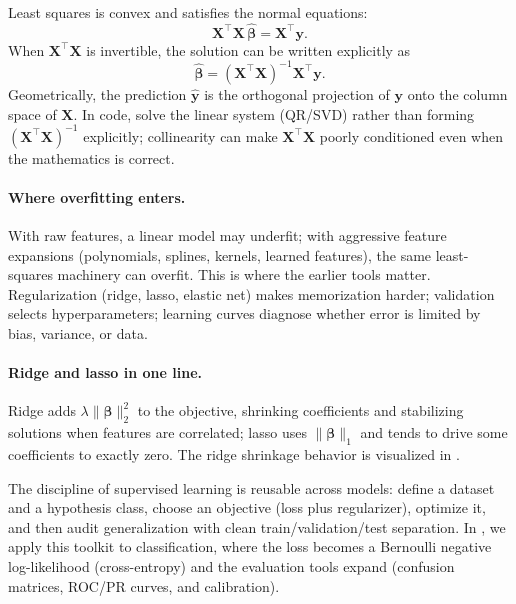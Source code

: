 \smallskip
\noindent Least squares is convex and satisfies the normal equations:
\begin{equation}
    \mathbf{X}^\top \mathbf{X}\,\hat{\boldsymbol{\beta}} = \mathbf{X}^\top \mathbf{y}.
\label{eq:normal_equations}
\end{equation}
When \(\mathbf{X}^\top \mathbf{X}\) is invertible, the solution can be written explicitly as
\begin{equation}
    \hat{\boldsymbol{\beta}} = (\mathbf{X}^\top \mathbf{X})^{-1}\mathbf{X}^\top \mathbf{y}.
\label{eq:ols_closed_form}
\end{equation}
Geometrically, the prediction \(\hat{\mathbf{y}}\) is the orthogonal projection of \(\mathbf{y}\) onto the column space of \(\mathbf{X}\). In code, solve the linear system (QR/SVD) rather than forming \((\mathbf{X}^\top \mathbf{X})^{-1}\) explicitly; collinearity can make \(\mathbf{X}^\top \mathbf{X}\) poorly conditioned even when the mathematics is correct.

\paragraph{Where overfitting enters.}
With raw features, a linear model may underfit; with aggressive feature expansions (polynomials, splines, kernels, learned features), the same least-squares machinery can overfit. This is where the earlier tools matter. Regularization (ridge, lasso, elastic net) makes memorization harder; validation selects hyperparameters; learning curves diagnose whether error is limited by bias, variance, or data.

\paragraph{Ridge and lasso in one line.}
Ridge adds \(\lambda\|\boldsymbol{\beta}\|_2^2\) to the objective, shrinking coefficients and stabilizing solutions when features are correlated; lasso uses \(\|\boldsymbol{\beta}\|_1\) and tends to drive some coefficients to exactly zero. The ridge shrinkage behavior is visualized in .

\medskip
\noindent The discipline of supervised learning is reusable across models: define a dataset and a hypothesis class, choose an objective (loss plus regularizer), optimize it, and then audit generalization with clean train/validation/test separation. In , we apply this toolkit to classification, where the loss becomes a Bernoulli negative log-likelihood (cross\hyp{}entropy) and the evaluation tools expand (confusion matrices, ROC/PR curves, and calibration).

